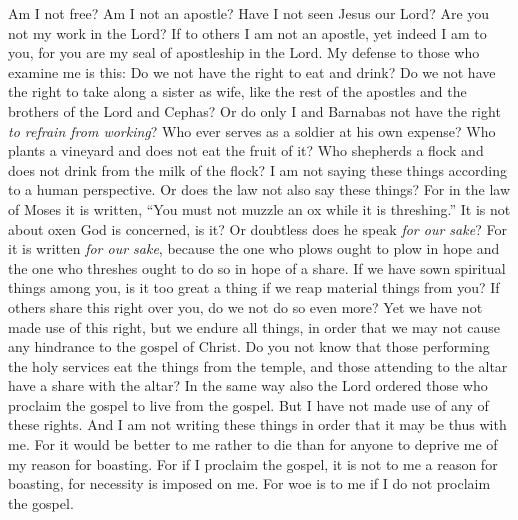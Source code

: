 \begin{biblechapter} %
 Am I not free? Am I not an apostle? Have I not seen Jesus our Lord? Are you not my work in the Lord?
\verse If to others I am not an apostle, yet indeed I am to you, for you are my seal of apostleship in the Lord.
\verse My defense to those who examine me is this:
\verse Do we not have the right to eat and drink?
\verse Do we not have the right to take along a sister as wife, like the rest of the apostles and the brothers of the Lord and Cephas?
\verse Or do only I and Barnabas not have the right \textit{to refrain from working}?
\verse Who ever serves as a soldier at his own expense? Who plants a vineyard and does not eat the fruit of it? Who shepherds a flock and does not drink from the milk of the flock?
\verse I am not saying these things according to a human perspective. Or does the law not also say these things?
\verse For in the law of Moses it is written, “You must not muzzle an ox while it is threshing.” It is not about oxen God is concerned, is it?
\verse Or doubtless does he speak \textit{for our sake}? For it is written \textit{for our sake}, because the one who plows ought to plow in hope and the one who threshes ought to do so in hope of a share.
\verse If we have sown spiritual things among you, is it too great a thing if we reap material things from you?
\verse If others share this right over you, do we not do so even more? Yet we have not made use of this right, but we endure all things, in order that we may not cause any hindrance to the gospel of Christ.
\verse Do you not know that those performing the holy services eat the things from the temple, and those attending to the altar have a share with the altar?
\verse In the same way also the Lord ordered those who proclaim the gospel to live from the gospel.
\verse But I have not made use of any of these rights. And I am not writing these things in order that it may be thus with me. For it would be better to me rather to die than for anyone to deprive me of my reason for boasting.
\verse For if I proclaim the gospel, it is not to me a reason for boasting, for necessity is imposed on me. For woe is to me if I do not proclaim the gospel.

\end{biblechapter}
